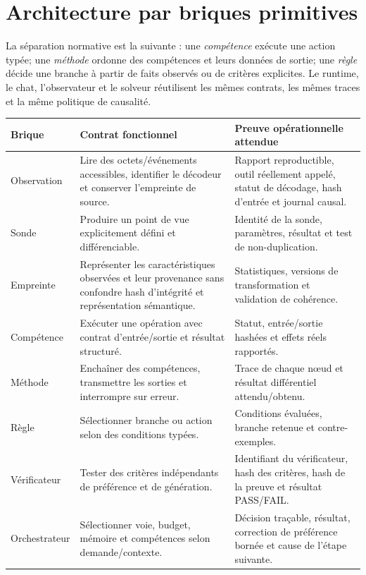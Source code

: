 \documentclass[11pt,a4paper]{article}
\begin{document}
\section{Architecture par briques primitives}
La séparation normative est la suivante : une \emph{compétence} exécute une action typée; une \emph{méthode} ordonne des compétences et leurs données de sortie; une \emph{règle} décide une branche à partir de faits observés ou de critères explicites. Le runtime, le chat, l'observateur et le solveur réutilisent les mêmes contrats, les mêmes traces et la même politique de causalité.

\begin{longtable}{p{.18\linewidth}p{.36\linewidth}p{.36\linewidth}}
\toprule
Brique & Contrat fonctionnel & Preuve opérationnelle attendue\\
\midrule
Observation & Lire des octets/événements accessibles, identifier le décodeur et conserver l'empreinte de source. & Rapport reproductible, outil réellement appelé, statut de décodage, hash d'entrée et journal causal.\\
Sonde & Produire un point de vue explicitement défini et différenciable. & Identité de la sonde, paramètres, résultat et test de non-duplication.\\
Empreinte & Représenter les caractéristiques observées et leur provenance sans confondre hash d'intégrité et représentation sémantique. & Statistiques, versions de transformation et validation de cohérence.\\
Compétence & Exécuter une opération avec contrat d'entrée/sortie et résultat structuré. & Statut, entrée/sortie hashées et effets réels rapportés.\\
Méthode & Enchaîner des compétences, transmettre les sorties et interrompre sur erreur. & Trace de chaque nœud et résultat différentiel attendu/obtenu.\\
Règle & Sélectionner branche ou action selon des conditions typées. & Conditions évaluées, branche retenue et contre-exemples.\\
Vérificateur & Tester des critères indépendants de préférence et de génération. & Identifiant du vérificateur, hash des critères, hash de la preuve et résultat PASS/FAIL.\\
Orchestrateur & Sélectionner voie, budget, mémoire et compétences selon demande/contexte. & Décision traçable, résultat, correction de préférence bornée et cause de l'étape suivante.\\
\bottomrule
\end{longtable}
\end{document}
